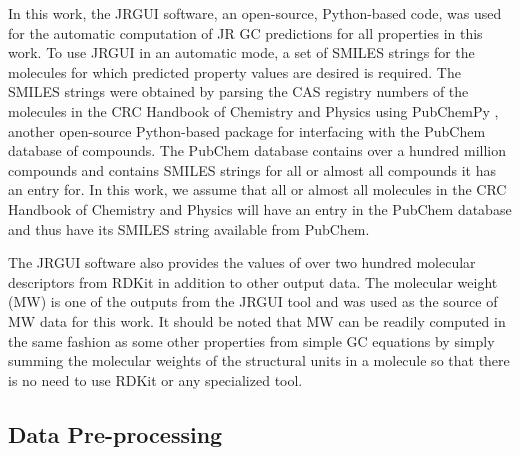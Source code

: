 \documentclass[journal=jacsat,manuscript=article, ]{achemso}
\begin{document}
In this work, the JRGUI \cite{shiJRguiPythonProgram2017} software, an open-source, Python-based code, was used for the automatic computation of JR GC predictions for all properties in this work. 
To use JRGUI in an automatic mode, a set of SMILES strings for the molecules for which predicted property values are desired is required. 
The SMILES strings were obtained by parsing the CAS registry numbers of the molecules in the CRC Handbook of Chemistry and Physics using PubChemPy \cite{PubChemPyDocumentationPubChemPy}, another open-source Python-based package for interfacing with the PubChem \cite{Kim2023} database of compounds. The PubChem database contains over a hundred million compounds and contains SMILES strings for all or almost all compounds it has an entry for. 
In this work, we assume that all or almost all molecules in the CRC Handbook of Chemistry and Physics will have an entry in the PubChem database and thus have its SMILES string available from PubChem.

The JRGUI software also provides the values of over two hundred molecular descriptors from RDKit \cite{RDKit} in addition to other output data. The molecular weight (MW) is one of the outputs from the JRGUI tool and was used as the source of MW data for this work. 
It should be noted that MW can be readily computed in the same fashion as some other properties from simple GC equations by simply summing the molecular weights of the structural units in a molecule so that there is no need to use RDKit or any specialized tool.

\subsection{Data Pre-processing} \label{sec:preprocess}
\end{document}
